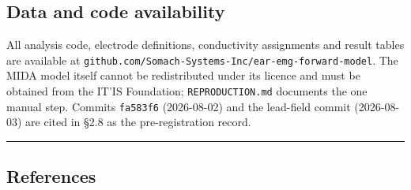 \documentclass[
  11pt,
  letterpaper,
]{article}
\begin{document}
\FloatBarrier
\subsection{Data and code availability}\label{data-and-code-availability}

All analysis code, electrode definitions, conductivity assignments and result
tables are available at \texttt{github.com/Somach-Systems-Inc/ear-emg-forward-model}.
The MIDA model itself cannot be redistributed under its licence and must be
obtained from the IT'IS Foundation; \texttt{REPRODUCTION.md} documents the one manual
step. Commits \texttt{fa583f6} (2026-08-02) and the lead-field commit (2026-08-03) are
cited in \S{}2.8 as the pre-registration record.

\begin{center}\rule{0.5\linewidth}{0.5pt}\end{center}

\FloatBarrier
\subsection{References}\label{references}
\end{document}

